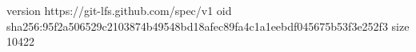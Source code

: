 version https://git-lfs.github.com/spec/v1
oid sha256:95f2a506529c2103874b49548bd18afec89fa4c1a1eebdf045675b53f3e252f3
size 10422
